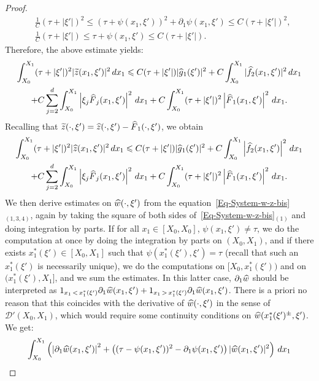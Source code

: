 \documentclass[AHL,Unicode,longabstracts]{cedram}
\newcommand{\scD}{\mathscr{D}}
\renewcommand{\leq}{\leqslant}
\renewcommand{\tilde}{\widetilde}
\renewcommand{\hat}{\widehat}
\let\oldtilde\tilde
\renewcommand*{\tilde}[1]{\mathchoice{\widetilde{#1}}{\widetilde{#1}}{\oldtilde{#1}}{\oldtilde{#1}}}
\let\oldhat\hat
\renewcommand*{\hat}[1]{\mathchoice{\widehat{#1}}{\widehat{#1}}{\oldhat{#1}}{\oldhat{#1}}}
\begin{document}
\begin{proof}
\begin{align*}
&
\frac{1}{C} (\tau + |\xi'|)^2
\leq (\tau + \psi(x_1, \xi'))^2 + \partial_1 \psi(x_1, \xi') \leq {C} (\tau + |\xi'|)^2,
\\
& \frac{1}{C} (\tau + |\xi'|) \leq \tau + \psi(x_1, \xi') \leq C (\tau + |\xi'|).
\end{align*}
Therefore, the above estimate yields:
\begin{multline*}
\int_{X_0}^{X_1} (\tau + |\xi'|)^2 |\tilde z(x_1, \xi')|^2 \, dx_1
\leq C (\tau + |\xi'|) |\hat g_1(\xi')|^2 + C \int_{X_0}^{X_1} | \widehat f_2(x_1, \xi') |^2 \, dx_1
\\
+ C \sum_{j=2}^d \int_{X_0}^{X_1} \left|\xi_j \hat F_j(x_1, \xi')\right|^2 \, dx_1 + C \int_{X_0}^{X_1} (\tau + |\xi'|)^2 \left|\hat F_1(x_1, \xi') \right|^2 \, dx_1.
\end{multline*}
Recalling that $\tilde z(\cdot, \xi') = \hat z(\cdot, \xi') -\hat F_1(\cdot, \xi')$, we obtain
\begin{multline*}
\int_{X_0}^{X_1} (\tau + |\xi'|)^2 |\hat z(x_1, \xi')|^2 \, dx_1
\leq C (\tau + |\xi'|) |\hat g_1(\xi')|^2 + C \int_{X_0}^{X_1} \left| \widehat f_2(x_1, \xi') \right|^2 \, dx_1
\\
+ C \sum_{j=2}^d \int_{X_0}^{X_1} \left|\xi_j \hat F_j(x_1, \xi')\right|^2 \, dx_1 + C \int_{X_0}^{X_1} (\tau + |\xi'|)^2 \left|\hat F_1(x_1, \xi') \right|^2 \, dx_1.
\end{multline*}
We then derive estimates on $\hat w(\cdot, \xi') $ from the equation~\eqref{Eq-System-w-z-bis}$_{(1,3,4)}$, again by taking the square of both sides of~\eqref{Eq-System-w-z-bis}$_{(1)}$ and doing integration by parts. If for all $x_1 \in [X_0, X_0]$, $\psi(x_1, \xi') \neq \tau$, we do the computation at once by doing the integration by parts on $(X_0, X_1)$, and if there exists $x_1^*(\xi') \in [X_0, X_1]$ such that $\psi(x_1^*(\xi'), \xi') = \tau$ (recall that such an $x_1^*(\xi')$ is necessarily unique), we do the computations on $[X_0, x_1^*(\xi'))$ and on $(x_1^*(\xi'), X_1]$, and we sum the estimates. In this latter case, $\partial_1 \hat w$ should be interpreted as $1_{x_1\,<\,x_1^*(\xi')} \partial_1 \hat w(x_1, \xi') + 1_{x_1\,>\,x_1^*(\xi')} \partial_1 \hat w(x_1, \xi')$. There is a priori no reason that this coincides with the derivative of $\hat w(\cdot, \xi')$ in the sense of $\scD'(X_0,X_1)$, which would require some continuity conditions on $\hat w(x_1^*(\xi')^\pm, \xi')$. We get:
\begin{multline*}
\int_{X_0}^{X_1}\left(\left|\partial_1 \hat w(x_1, \xi')\right|^2 + \left((\tau - \psi(x_1, \xi'))^2 - \partial_1 \psi(x_1, \xi') \right) |\hat w(x_1, \xi')|^2\right) \, dx_1

\end{multline*}
\end{proof}
\end{document}
